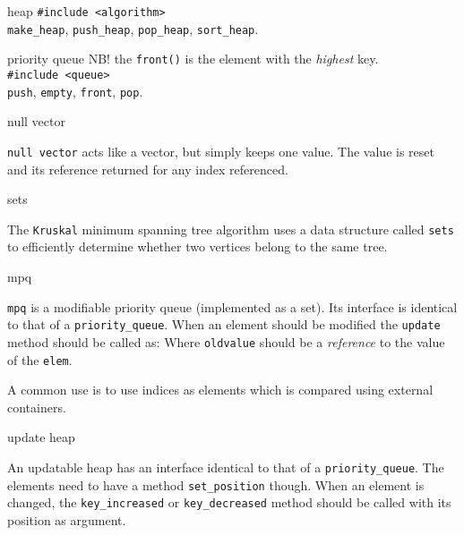 \begin{algorithm}{heap}
\usage{}
{\tt \#include <algorithm>}\\
{\tt make\_heap}, {\tt push\_heap}, {\tt pop\_heap}, {\tt sort\_heap}.
\end{algorithm}

\begin{algorithm}{priority queue}
\usage{}
NB! the {\tt front()} is the element with the {\em highest} key.\\
{\tt \#include <queue>}\\
{\tt push}, {\tt empty}, {\tt front}, {\tt pop}.
\end{algorithm}

\begin{algorithm}{null vector}

{\tt null vector} acts like a vector, but simply keeps one value.
The value is reset and its reference returned for any index referenced.
\end{algorithm}

\begin{algorithm}{sets}

The {\tt Kruskal} minimum spanning tree algorithm uses a data structure
called {\tt sets} to efficiently determine whether two vertices belong to
the same tree.
\end{algorithm}

\begin{algorithm}{mpq}

{\tt mpq} is a modifiable priority queue (implemented as a set). Its interface
is identical to that of a {\tt priority\_queue}. When an element should be
modified the {\tt update} method should be called as:
Where {\tt oldvalue} should be a \emph{reference} to the value of the
{\tt elem}.

A common use is to use indices as elements which is compared using external
containers.
\end{algorithm}

\begin{algorithm}{update heap}

An updatable heap has an interface identical to that of a
{\tt priority\_queue}.
The elements need to have a method {\tt set\_position} though. When an element
is changed, the {\tt key\_increased} or {\tt key\_decreased} method should
be called with its position as argument.
\end{algorithm}

\begin{sourceslandscape}
\end{sourceslandscape}
